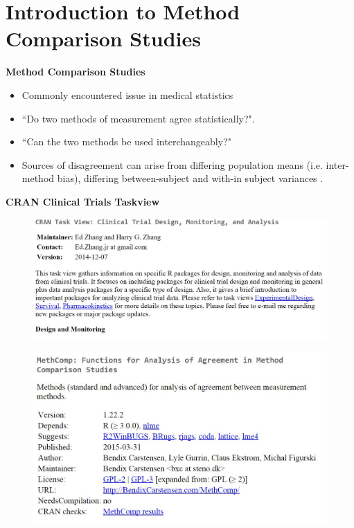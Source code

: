 \documentclass[compress]{beamer}        %
\makeatletter
\newcommand{\tcb}{\textcolor{beamer@blendedblue}}
\makeatother
\begin{document}
		\section[Intro to MCS]{Introduction to Method Comparison Studies}
		\begin{frame}{\bf \tcb{Method Comparison Studies}}
			\large
			\begin{itemize}\itemsep0.7cm
				\item Commonly encountered issue in medical statistics
				\item ``Do two methods of measurement agree statistically?".
				\item ``Can the two methods be used interchangeably?"
				\item Sources of disagreement can arise from differing population means (i.e. inter-method bias), differing between-subject and with-in subject variances \cite{Roy2009}.
			\end{itemize}
		\end{frame}
\begin{frame}
\textbf{CRAN Clinical Trials Taskview}	
	\begin{figure}
\centering
\includegraphics[width=1.1\linewidth]{images/CRAN-clinicaltrials}
\end{figure}

\end{frame}
\begin{frame}
	
	\begin{figure}
		\centering
		\includegraphics[width=1.05\linewidth]{images/CRAN-MethComp}

	\end{figure}
	
\end{frame}
\end{document}

